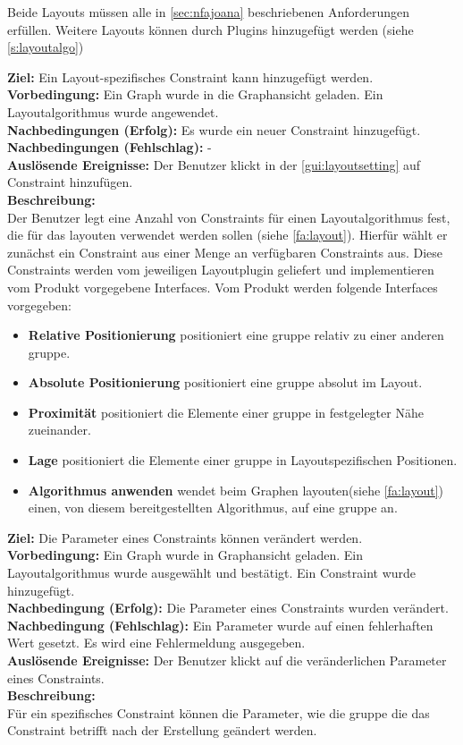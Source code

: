 Beide Layouts müssen alle in \autoref{sec:nfajoana} beschriebenen Anforderungen erfüllen.
Weitere Layouts können durch Plugins hinzugefügt werden (siehe \ref{s:layoutalgo})

\label{fa:constraints}
\textbf{Ziel:} Ein Layout-spezifisches Constraint kann hinzugefügt werden.\\
\textbf{Vorbedingung:} Ein Graph wurde in die Graphansicht geladen. Ein Layoutalgorithmus wurde angewendet.\\
\textbf{Nachbedingungen (Erfolg):} Es wurde ein neuer Constraint hinzugefügt.\\
\textbf{Nachbedingungen (Fehlschlag):} -\\
\textbf{Auslösende Ereignisse:} Der Benutzer klickt in der \ref{gui:layoutsetting} auf Constraint hinzufügen.\\
\textbf{Beschreibung: }\\
Der Benutzer legt eine Anzahl von Constraints für einen Layoutalgorithmus fest, die für das layouten verwendet werden sollen (siehe \ref{fa:layout}). Hierfür wählt er zunächst ein Constraint aus einer Menge an verfügbaren Constraints aus. Diese Constraints werden vom jeweiligen Layoutplugin geliefert und implementieren vom Produkt vorgegebene Interfaces. Vom Produkt werden folgende Interfaces vorgegeben:
\begin{itemize}[nolistsep]
  \item \textbf{Relative Positionierung} positioniert eine \gls{gruppe} relativ zu einer anderen \gls{gruppe}.
  \item \textbf{Absolute Positionierung} positioniert eine \gls{gruppe} absolut im Layout.
  \item \textbf{Proximität} positioniert die Elemente einer \gls{gruppe} in festgelegter Nähe zueinander.
  \item \textbf{Lage} positioniert die Elemente einer \gls{gruppe} in Layoutspezifischen Positionen.
  \item \textbf{Algorithmus anwenden} wendet beim Graphen layouten(siehe \ref{fa:layout}) einen, von diesem bereitgestellten Algorithmus, auf eine \gls{gruppe} an. 
\end{itemize}

\label{fa:constraintsettings}
\textbf{Ziel:} Die Parameter eines Constraints können verändert werden.\\
\textbf{Vorbedingung:} Ein Graph wurde in Graphansicht geladen. Ein Layoutalgorithmus wurde ausgewählt und bestätigt. Ein Constraint wurde hinzugefügt. \\
\textbf{Nachbedingung (Erfolg):} Die Parameter eines Constraints wurden verändert.\\
\textbf{Nachbedingung (Fehlschlag):} Ein Parameter wurde auf einen fehlerhaften Wert gesetzt. Es wird eine Fehlermeldung ausgegeben. \\
\textbf{Auslösende Ereignisse:} Der Benutzer klickt auf die veränderlichen Parameter eines Constraints.\\
\textbf{Beschreibung:}\\
Für ein spezifisches Constraint können die Parameter, wie die \gls{gruppe} die das Constraint betrifft nach der Erstellung geändert werden.\\

